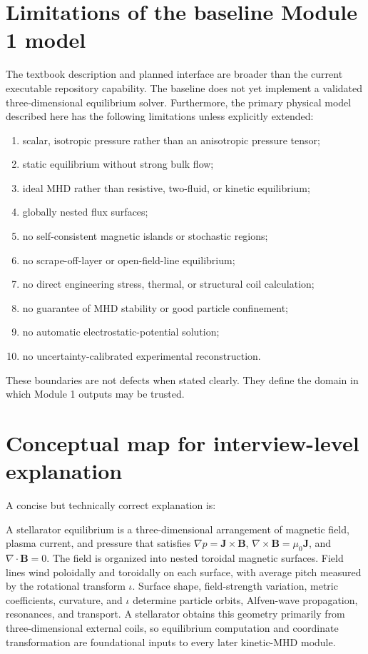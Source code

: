 \section{Limitations of the baseline Module 1 model}
\label{sec:limitations}

The textbook description and planned interface are broader than the current executable repository capability. The baseline does not yet implement a validated three-dimensional equilibrium solver. Furthermore, the primary physical model described here has the following limitations unless explicitly extended:
\begin{enumerate}[leftmargin=1.6em]
\item scalar, isotropic pressure rather than an anisotropic pressure tensor;
\item static equilibrium without strong bulk flow;
\item ideal MHD rather than resistive, two-fluid, or kinetic equilibrium;
\item globally nested flux surfaces;
\item no self-consistent magnetic islands or stochastic regions;
\item no scrape-off-layer or open-field-line equilibrium;
\item no direct engineering stress, thermal, or structural coil calculation;
\item no guarantee of MHD stability or good particle confinement;
\item no automatic electrostatic-potential solution;
\item no uncertainty-calibrated experimental reconstruction.
\end{enumerate}
These boundaries are not defects when stated clearly. They define the domain in which Module 1 outputs may be trusted.

\section{Conceptual map for interview-level explanation}
\label{sec:interview_map}

A concise but technically correct explanation is:

\begin{physicsbox}
A stellarator equilibrium is a three-dimensional arrangement of magnetic field, plasma current, and pressure that satisfies $\nabla p=\mathbf J\times\mathbf B$, $\nabla\times\mathbf B=\mu_0\mathbf J$, and $\nabla\cdot\mathbf B=0$. The field is organized into nested toroidal magnetic surfaces. Field lines wind poloidally and toroidally on each surface, with average pitch measured by the rotational transform $\iota$. Surface shape, field-strength variation, metric coefficients, curvature, and $\iota$ determine particle orbits, Alfven-wave propagation, resonances, and transport. A stellarator obtains this geometry primarily from three-dimensional external coils, so equilibrium computation and coordinate transformation are foundational inputs to every later kinetic-MHD module.
\end{physicsbox}

